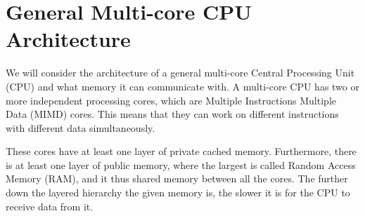 \section{General Multi-core CPU Architecture}
\label{sec:cpu}

We will consider the architecture of a general multi-core Central Processing Unit (CPU) and what memory it can communicate with.
A multi-core CPU has two or more independent processing cores, which are Multiple Instructions Multiple Data (MIMD) cores.
This means that they can work on different instructions with different data simultaneously.

These cores have at least one layer of private cached memory.
Furthermore, there is at least one layer of public memory, where the largest is called Random Access Memory (RAM), and it thus shared memory between all the cores.
The further down the layered hierarchy the given memory is, the slower it is for the CPU to receive data from it.
